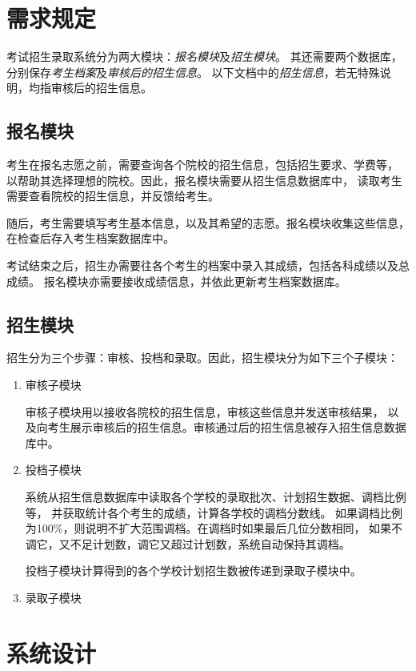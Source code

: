 \documentclass[CJK,utf8]{ctexrep}
\begin{document}
\section*{需求规定}

考试招生录取系统分为两大模块：\emph{报名模块}及\emph{招生模块}。
其还需要两个数据库，分别保存\emph{考生档案}及\emph{审核后的招生信息}。
以下文档中的\emph{招生信息}，若无特殊说明，均指审核后的招生信息。

\subsection*{报名模块}

考生在报名志愿之前，需要查询各个院校的招生信息，包括招生要求、学费等，
以帮助其选择理想的院校。因此，报名模块需要从招生信息数据库中，
读取考生需要查看院校的招生信息，并反馈给考生。

随后，考生需要填写考生基本信息，以及其希望的志愿。报名模块收集这些信息，
在检查后存入考生档案数据库中。

考试结束之后，招生办需要往各个考生的档案中录入其成绩，包括各科成绩以及总成绩。
报名模块亦需要接收成绩信息，并依此更新考生档案数据库。

\subsection*{招生模块}

招生分为三个步骤：审核、投档和录取。因此，招生模块分为如下三个子模块：

\begin{enumerate}
	\item 审核子模块
	
	审核子模块用以接收各院校的招生信息，审核这些信息并发送审核结果，
	以及向考生展示审核后的招生信息。审核通过后的招生信息被存入招生信息数据库中。
	
	\item 投档子模块
	
	系统从招生信息数据库中读取各个学校的录取批次、计划招生数据、调档比例等，
	并获取统计各个考生的成绩，计算各学校的调档分数线。
	如果调档比例为100\%，则说明不扩大范围调档。在调档时如果最后几位分数相同，
	如果不调它，又不足计划数，调它又超过计划数，系统自动保持其调档。
	
	投档子模块计算得到的各个学校计划招生数被传递到录取子模块中。
	
	\item 录取子模块
\end{enumerate}

\section*{系统设计}
\end{document}
